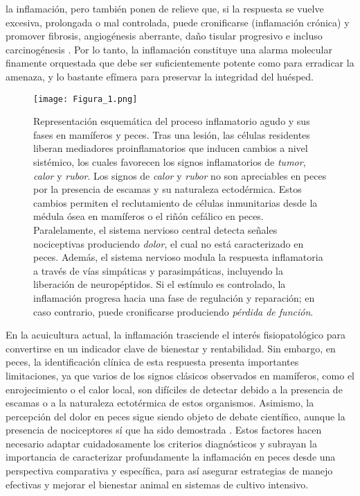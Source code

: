 \documentclass[10pt,a4paper]{article}
\begin{document}
la inflamación, pero también ponen de relieve que, si la respuesta se vuelve excesiva, prolongada o mal controlada, puede cronificarse (inflamación crónica) y promover fibrosis, angiogénesis aberrante, daño tisular progresivo e incluso carcinogénesis \parencite{Nathan2010}. Por lo tanto, la inflamación constituye una alarma molecular finamente orquestada que debe ser suficientemente potente como para erradicar la amenaza, y lo bastante efímera para preservar la integridad del huésped.

\begin{figure}[ht]
  \centering
    \texttt{[image: Figura\_1.png]} 

  \caption{Representación esquemática del proceso inflamatorio agudo y sus fases en mamíferos y peces. Tras una lesión, las células residentes liberan mediadores proinflamatorios que inducen cambios a nivel sistémico, los cuales favorecen los signos inflamatorios de \emph{tumor}, \emph{calor} y \emph{rubor}. Los signos de \emph{calor} y \emph{rubor} no son apreciables en peces por la presencia de escamas y su naturaleza ectodérmica. Estos cambios permiten el reclutamiento de células inmunitarias desde la médula ósea en mamíferos o el riñón cefálico en peces. Paralelamente, el sistema nervioso central detecta señales nociceptivas produciendo  \emph{dolor}, el cual no está caracterizado en peces. Además, el sistema nervioso modula la respuesta inflamatoria a través de vías simpáticas y parasimpáticas, incluyendo la liberación de neuropéptidos. Si el estímulo es controlado, la inflamación progresa hacia una fase de regulación y reparación; en caso contrario, puede cronificarse produciendo \emph{pérdida de función}.}
  \label{fig:1}
\end{figure}

En la acuicultura actual, la inflamación trasciende el interés fisiopatológico para convertirse en un indicador clave de bienestar y rentabilidad. Sin embargo, en peces, la identificación clínica de esta respuesta presenta importantes limitaciones, ya que varios de los signos clásicos observados en mamíferos, como el enrojecimiento o el calor local, son difíciles de detectar debido a la presencia de escamas o a la naturaleza ectotérmica de estos organismos. Asimismo, la percepción del dolor en peces sigue siendo objeto de debate científico, aunque la presencia de nociceptores sí que ha sido demostrada \parencite{Sneddon2015,Sneddon2003}. Estos factores hacen necesario adaptar cuidadosamente los criterios diagnósticos y subrayan la importancia de caracterizar profundamente la inflamación en peces desde una perspectiva comparativa y específica, para así asegurar estrategias de manejo efectivas y mejorar el bienestar animal en sistemas de cultivo intensivo.
\end{document}
